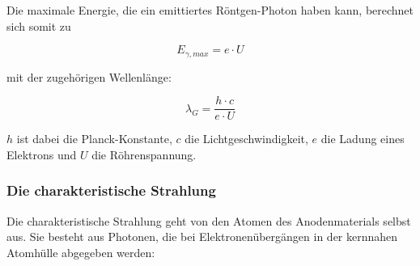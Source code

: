Die  maximale  Energie,  die  ein  emittiertes  R\"ontgen-Photon  haben  kann,
berechnet sich somit zu

\begin{equation}
    \label{eq:E_gamma_max}
    E_{\gamma,max} = e \cdot U
\end{equation}

mit der zugeh\"origen Wellenl\"ange:

\begin{equation}
    \label{eq:lambda_G}
    \lambda_G = \frac{h \cdot c}{e \cdot U}
\end{equation}

$h$  ist dabei  die Planck-Konstante,  $c$ die  Lichtgeschwindigkeit, $e$  die
Ladung eines Elektrons und $U$ die R\"ohrenspannung.


\subsubsection{Die charakteristische Strahlung}
\label{subsubsec:charaktStrahlung}

Die charakteristische Strahlung geht von den Atomen des Anodenmaterials selbst aus.
Sie besteht aus Photonen, die bei Elektronen\"uberg\"angen in der kernnahen Atomh\"ulle
abgegeben werden:

